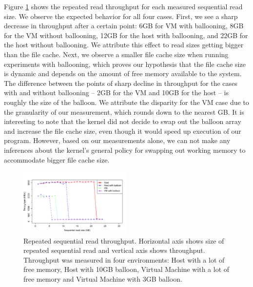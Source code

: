 Figure \ref{fig:p3graph} shows the repeated read throughput for each measured sequential read size. We observe the expected behavior for all four cases. First, we see a sharp decrease in throughput after a certain point: 6GB for VM with ballooning, 8GB for the VM without ballooning, 12GB for the host with ballooning, and 22GB for the host without ballooning. We attribute this effect to read sizes getting bigger than the file cache. Next, we observe a smaller file cache size when running experiments with ballooning, which proves our hypothesis that the file cache size is dynamic and depends on the amount of free memory available to the system. The difference between the points of sharp decline in throughput for the cases with and without ballooning -- 2GB for the VM and 10GB for the host -- is roughly the size of the balloon. We attribute the disparity for the VM case due to the granularity of our measurement, which rounds down to the nearest GB. It is interesting to note that the kernel did not decide to swap out the balloon array and increase the file cache size, even though it would speed up execution of our program. However, based on our measurements alone, we can not make any inferences about the kernel's general policy for swapping out working memory to accommodate bigger file cache size. 

\begin{figure}[t!]
	\includegraphics[width=0.5\textwidth]{./figures/p3.pdf}
	\caption{Repeated sequential read throughput. Horizontal axis shows size of repeated sequential read and vertical axis shows throughput. Throughput was measured in four environments: Host with a lot of free memory, Host with 10GB balloon, Virtual Machine with a lot of free memory and Virtual Machine with 3GB balloon.}
	\label{fig:p3graph}
\end{figure}

